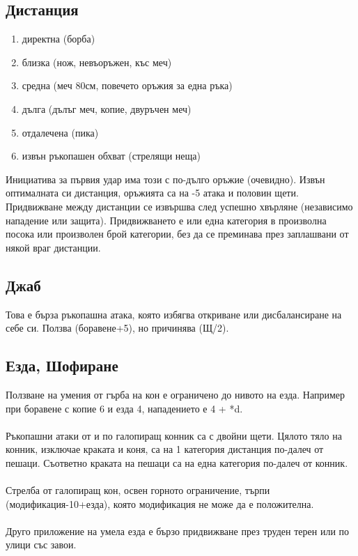 \begin{multicols}{2}
\subsection{Дистанция}
\begin{enumerate}
\item{директна (борба)}
\item{близка (нож, невъоръжен, къс меч)}
\item{средна (меч 80см, повечето оръжия за една ръка)}
\item{дълга (дълъг меч, копие, двуръчен меч)}
\item{отдалечена (пика)}
\item{извън ръкопашен обхват (стрелящи неща)}
\end{enumerate}
Инициатива за първия удар има този с по-дълго оръжие (очевидно).
Извън оптималната си дистанция, оръжията са на -5 атака и половин щети.
Придвижване между дистанции се извършва след успешно хвърляне (независимо нападение или защита).
Придвижването е или една категория в произволна посока или произволен брой категории, без да се преминава през заплашвани от някой враг дистанции.
\\


\subsection{Джаб}
Това е бърза ръкопашна атака, която избягва откриване или дисбалансиране на себе си.
Ползва (боравене+5), но причинява (Щ/2).
\end{multicols}


\subsection{Езда, Шофиране}
Ползване на умения от гърба на кон е ограничено до нивото на езда.
Например при боравене с копие 6 и езда 4, нападението е 4 + *d.
\\
\\
Ръкопашни атаки от и по галопиращ конник са с двойни щети.
Цялото тяло на конник, изключае краката и коня, са на 1 категория дистанция по-далеч от пешаци.
Съответно краката на пешаци са на една категория по-далеч от конник.
\\
\\
Стрелба от галопиращ кон, освен горното ограничение, търпи (модификация-10+езда), която модификация не може да е положителна.
\\
\\
Друго приложение на умела езда е бързо придвижване през труден терен или по улици със завои.


